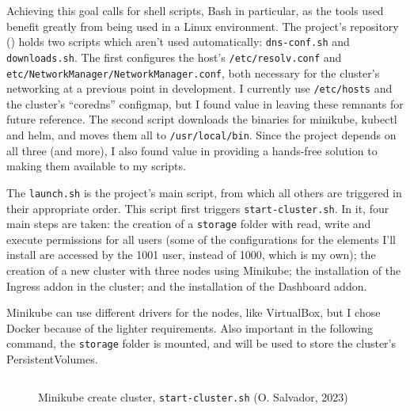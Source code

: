 \documentclass[11pt]{article}
\begin{document}
\begin{flushleft}
Achieving this goal calls for shell scripts, Bash in particular, as the tools used benefit greatly from being used in a Linux environment. The project's repository (\cite{misgit2}) holds two scripts which aren't used automatically: \texttt{dns-conf.sh} and \texttt{downloads.sh}. The first configures the host's \texttt{/etc/resolv.conf} and \texttt{etc/NetworkManager/NetworkManager.conf}, both necessary for the cluster's networking at a previous point in development. I currently use \texttt{/etc/hosts} and the cluster's ``coredns'' configmap, but I found value in leaving these remnants for future reference. The second script downloads the binaries for \gls{minikube}, \gls{kubectl} and \gls{helm}, and moves them all to \texttt{/usr/local/bin}. Since the project depends on all three (and more), I also found value in providing a hands-free solution to making them available to my scripts.
\linebreak

The \texttt{launch.sh} is the project's main script, from which all others are triggered in their appropriate order. This script first triggers \texttt{start-cluster.sh}. In it, four main steps are taken: the creation of a \texttt{storage} folder with read, write and execute permissions for all users (some of the configurations for the elements I'll install are accessed by the 1001 user, instead of 1000, which is my own); the creation of a new cluster with three nodes using Minikube; the installation of the Ingress addon in the cluster; and the installation of the Dashboard addon.
\linebreak

Minikube can use different drivers for the nodes, like VirtualBox, but I chose Docker because of the lighter requirements. Also important in the following command, the \texttt{storage} folder is mounted, and will be used to store the cluster's PersistentVolumes.
\linebreak

    \begin{figure}[htb]
        \centering
        \begin{subfigure}{.7\textwidth}
            \hspace{-5cm}
            \inputminted[fontsize=\scriptsize, firstline=60, lastline=62, linenos, frame=single, tabsize=1]{bash}{../../start-cluster.sh}
          \end{subfigure}
        \caption{Minikube create cluster, \texttt{start-cluster.sh} (O. Salvador, 2023)}
    \end{figure}
    \linebreak


\end{flushleft}
\end{document}
